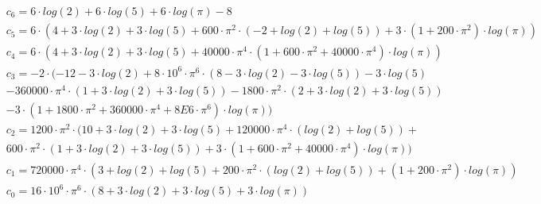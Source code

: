 \documentclass[12pt,a4paper,final,twoside,openright]{report}
\begin{document}
\begin{eqnarray*}
&c_6=6\cdot log(2)+6\cdot log(5)+6\cdot log(\pi )-8\\
&c_5=6\cdot (4+3\cdot log(2)+3\cdot log(5)+600\cdot \pi^2\cdot (-2+log(2)+log(5))+3\cdot (1+200\cdot \pi^2)\cdot log(\pi ))\\
&c_4=6\cdot (4+3\cdot log(2)+3\cdot log(5)+40000\cdot \pi^4\cdot (1+600\cdot \pi^2+40000\cdot \pi^4)\cdot log(\pi ))\\
&c_3=-2\cdot (-12-3\cdot log(2)+8\cdot 10^6\cdot \pi^6\cdot (8-3\cdot log(2)-3\cdot log(5))-3\cdot log(5)\\
&-360000\cdot \pi^4\cdot (1+3\cdot log(2)+3\cdot log(5))-1800\cdot \pi^2\cdot (2+3\cdot log(2)+3\cdot log(5))\\
&-3\cdot (1+1800\cdot \pi^2+360000\cdot \pi^4+8E6\cdot \pi^6)\cdot log(\pi ))\\
&c_2=1200\cdot \pi^2\cdot (10+3\cdot log(2)+3\cdot log(5)+120000\cdot \pi^4\cdot (log(2)+log(5)) +\\
&600\cdot \pi^2\cdot (1+3\cdot log(2)+3\cdot log(5))+3\cdot (1+600\cdot \pi^2+40000\cdot \pi^4)\cdot log(\pi ))\\
&c_1=720000\cdot \pi^4\cdot (3+log(2)+log(5)+200\cdot \pi^2\cdot (log(2)+log(5))+(1+200\cdot \pi^2)\cdot log(\pi ))\\
&c_0=16\cdot 10^6\cdot \pi^6\cdot (8+3\cdot log(2)+3\cdot log(5)+3\cdot log(\pi ))
\end{eqnarray*}
\end{document}
